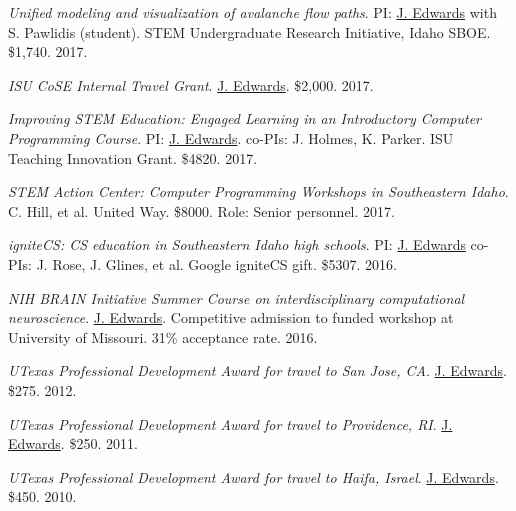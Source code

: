 \documentclass[margin,line]{res}
\begin{document}
\begin{resume}
\textit{Unified modeling and visualization of avalanche flow paths}. PI: \underline{J. Edwards} with S. Pawlidis (student). STEM Undergraduate Research Initiative, Idaho SBOE. \$1,740. 2017.

\textit{ISU CoSE Internal Travel Grant}. \underline{J. Edwards}. \$2,000. 2017.

\textit{Improving STEM Education: Engaged Learning in an Introductory  Computer Programming Course}. PI: \underline{J. Edwards}. co-PIs: J. Holmes, K. Parker. ISU Teaching Innovation Grant. \$4820. 2017.

\textit{STEM Action Center: Computer Programming Workshops in Southeastern Idaho}. C. Hill, et al. United Way. \$8000. Role: Senior personnel. 2017.

\textit{igniteCS: CS education in Southeastern Idaho high schools}. PI: \underline{J. Edwards} co-PIs: J. Rose, J. Glines, et al. Google igniteCS gift. \$5307. 2016.

\textit{NIH BRAIN Initiative Summer Course on interdisciplinary computational neuroscience}. \underline{J. Edwards}. Competitive admission to funded workshop at University of Missouri. 31\% acceptance rate. 2016. %

\textit{UTexas Professional Development Award for travel to San Jose, CA}. \underline{J. Edwards}. \$275. 2012. %

\textit{UTexas Professional Development Award for travel to Providence, RI}. \underline{J. Edwards}. \$250. 2011. %

\textit{UTexas Professional Development Award for travel to Haifa, Israel}. \underline{J. Edwards}. \$450. 2010. %



\end{resume}
\end{document}
